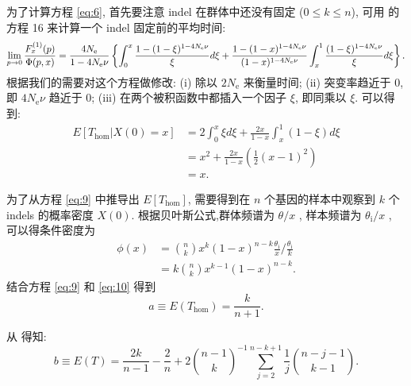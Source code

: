\documentclass[12pt]{article}
\begin{document}
为了计算方程 \ref{eq:6}, 首先要注意 indel 在群体中还没有固定 ($0 \le k \le n$),
可用 \textcite{maruyama1975} 的方程 16 来计算一个 indel 固定前的平均时间:
\begin{equation*}
    \lim_{p \to 0} \frac{F_x^\text{(1)}(p)}{\Phi(p, x)}
    = \frac{4N_\text{e}}{1-4N_\text{e}\nu}
    \left\{
    \int_0^x \frac{1-(1-\xi)^{1-4N_\text{e}\nu}}{\xi} d\xi \\
    + \frac{1-(1-x)^{1-4N_\text{e}\nu}}{(1-x)^{1-4N_\text{e}\nu}}
    \int_x^1 \frac{(1-\xi)^{1-4N_\text{e}\nu}}{\xi} d\xi
    \right\}
    \text{.}
\end{equation*}
根据我们的需要对这个方程做修改:
(i) 除以 $2N_\text{e}$ 来衡量时间;
(ii) 突变率趋近于 0, 即 $4N_\text{e}\nu$ 趋近于 0;
(iii) 在两个被积函数中都插入一个因子 $\xi$, 即同乘以 $\xi$. 可以得到:
\begin{equation} \label{eq:9}
    \begin{split}
        E[T_\text{hom} | X(0)=x]
        &= 2 \int_0^x \xi d\xi + \frac{2x}{1-x} \int_x^1 (1-\xi) d\xi \\
        &= x^2 + \frac{2x}{1-x} \left(\frac{1}{2} (x - 1)^2 \right) \\
        &= x
        \text{.}
    \end{split}
\end{equation}

为了从方程 \ref{eq:9} 中推导出 $E[T_\text{hom}]$, 需要得到在 $n$ 个基因的样本中观察到 $k$ 个 indels 的概率密度 $X(0)$.
根据贝叶斯公式,群体频谱为 $\theta/x$ \parencite{kimura1969, kimura1971a, ewens2004},
样本频谱为 $\theta_\text{i}/x$ \parencite{watterson1975, ewens2004}, 可以得条件密度为
\begin{equation} \label{eq:10}
    \begin{split}
        \phi(x)
        &= \binom{n}{k} x^k (1-x)^{n-k} \frac{\theta_\text{i}}{x} / \frac{\theta_\text{i}}{k} \\
        &= k \binom{n}{k} x^{k-1} (1-x)^{n-k}
        \text{.}
    \end{split}
\end{equation}
结合方程 \ref{eq:9} 和 \ref{eq:10} 得到
\begin{equation} \label{eq:11}
    a \equiv E(T_\text{hom}) = \frac{k}{n+1}
    \text{.}
\end{equation}

从 \textcite{wiuf1999} 得知:
\begin{equation} \label{eq:12}
    b \equiv E(T) = \frac{2k}{n-1} - \frac{2}{n}
    + 2 \binom{n-1}{k}^{-1} \sum_{j=2}^{n-k+1} \frac{1}{j} \binom{n-j-1}{k-1}
    \text{.}
\end{equation}
\end{document}
